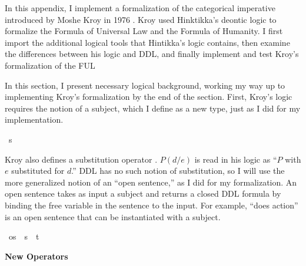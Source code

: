 \begin{isabellebody}
\begin{isamarkuptext}
\newpage%
\end{isamarkuptext}\isamarkuptrue%
%
\isadelimdocument
%
\endisadelimdocument
%
\isatagdocument
%
\isamarkuptrue%
%
\endisatagdocument
{\isafolddocument}%
%
\isadelimdocument
%
\endisadelimdocument
%
\begin{isamarkuptext}%
In this appendix, I implement a formalization of the categorical imperative introduced by Moshe Kroy in
1976 \citep{kroy}. Kroy used Hinktikka's deontic logic to formalize the Formula of Universal Law and
the Formula of Humanity. I first import the additional logical tools that Hintikka's logic contains, 
then examine the differences between his logic and DDL, and finally implement 
and test Kroy's formalization of the FUL%
\end{isamarkuptext}\isamarkuptrue%
%
\isadelimdocument
%
\endisadelimdocument
%
\isatagdocument
%
\isamarkuptrue%
%
\endisatagdocument
{\isafolddocument}%
%
\isadelimdocument
%
\endisadelimdocument
%
\begin{isamarkuptext}%
In this section, I present necessary logical background, working my way up to implementing Kroy's
formalization by the end of the section. First, Kroy's logic requires the notion of a subject, 
which I define as a new type, just as I did for my implementation.%
\end{isamarkuptext}\isamarkuptrue%
\isamarkupfalse%
\ s\ %
%
\begin{isamarkuptext}%
Kroy also defines a substitution operator \citep[196]{kroy}.
$P (d/e)$ is read in his logic as ``$P$ with $e$ substituted 
for $d$.'' DDL has no such notion of substitution, so I will use the more generalized notion of an ``open 
sentence,'' as I did for my formalization. An open sentence takes as input a subject and returns a 
closed DDL formula by binding the free variable in the sentence to the input. For example, 
``does action'' is an open sentence that can be instantiated with a subject.%
\end{isamarkuptext}\isamarkuptrue%
\isamarkupfalse%
\ os\ {\isacharequal}\ {\isachardoublequoteopen}{\isacharparenleft}s\ {\isasymRightarrow}\ t{\isacharparenright}{\isachardoublequoteclose}\isanewline
%
\isanewline
%
%
\begin{isamarkuptext}%
\noindent \textbf{New Operators}


\end{isamarkuptext}
\end{isabellebody}
